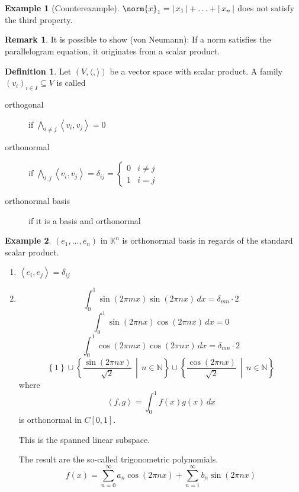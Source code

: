 \documentclass[a4paper,landscape,twocolumn]{article}
\newcommand\abs[1]{|\,#1\,|}
\newcommand\set[1]{\left\{#1\right\}}
\newcommand\setdef[2]{\left\{#1\,\middle|\,#2\right\}}
\newcommand\functional[1]{\left\langle{#1}\right\rangle}
\theoremstyle{definition}
\newtheorem{defi}{Definition}
\newtheorem{ex}{Example}
\newtheorem{rem}{Remark}
\DeclarePairedDelimiter\norm\lVert\rVert
\begin{document}
\begin{ex}[Counterexample]
  $\norm{x}_1 = \abs{x_1} + \ldots + \abs{x_n}$ does not satisfy the third property.
\end{ex}

\begin{rem}
  It is possible to show (von Neumann):
  If a norm satisfies the parallelogram equation,
  it originates from a scalar product.
\end{rem}

\begin{defi}
  Let $(V, \langle, \rangle)$ be a vector space with scalar product.
  A family $(v_i)_{i \in I} \subseteq V$ is called
  \begin{description}
    \item[orthogonal] if $\bigwedge_{i\neq j} \functional{v_i, v_j} = 0$
    \item[orthonormal] if $\bigwedge_{i,j} \functional{v_i, v_j} = \delta_{ij} = \begin{cases} 0 & i \neq j \\ 1 & i = j \end{cases}$
    \item[orthonormal basis] if it is a basis and orthonormal
  \end{description}
\end{defi}

\begin{ex}
  $(e_1, \ldots, e_n)$ in $\mathbb K^n$ is orthonormal basis in regards of the standard scalar product.
  \begin{enumerate}
    \item $\functional{e_i, e_j} = \delta_{ij}$
    \item
      \[ \int_0^1 \sin(2\pi mx) \sin(2\pi nx) \, dx = \delta_{mn} \cdot 2 \]
      \[ \int_0^1 \sin(2\pi nx) \cos(2\pi nx) \, dx = 0\]
      \[ \int_0^1 \cos(2\pi mx) \cos(2\pi nx) \, dx = \delta_{mn} \cdot 2 \]
      \[ \set{1} \cup \setdef{\frac{\sin(2\pi nx)}{\sqrt2}}{n \in \mathbb N} \cup \setdef{\frac{\cos(2\pi nx)}{\sqrt{2}}}{n \in \mathbb N} \]
      where
      \[ \functional{f,g} = \int_0^1 f(x) g(x) \, dx \]
      is orthonormal in $C[0,1]$.

      This is the spanned linear subspace.

      The result are the so-called trigonometric polynomials.
      \[ f(x) = \sum_{n=0}^\infty a_n \cos(2\pi nx) + \sum_{n=1}^\infty b_n \sin(2\pi nx) \]
  \end{enumerate}
\end{ex}
\end{document}
